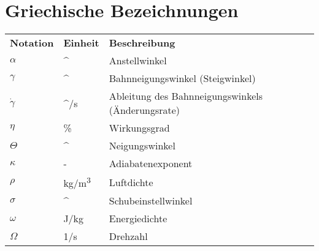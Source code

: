 \section*{Griechische Bezeichnungen}
\begin{longtable}{lp{2.5cm}p{10.5cm}}
	\textbf{Notation} & \textbf{Einheit} & \textbf{Beschreibung}\\
	\ensuremath{\alpha}	& \si{^\circ}		& Anstellwinkel \\
	\ensuremath{\gamma}	& \si{^\circ}		& Bahnneigungswinkel (Steigwinkel)\\
	\ensuremath{\dot{\gamma}}& \si{^\circ /s}& Ableitung des Bahnneigungswinkels (Änderungsrate) \\
	\ensuremath{\eta}	& \si{\%}			& Wirkungsgrad \\
	\ensuremath{\Theta} & \si{^\circ}		& Neigungswinkel \\
	\ensuremath{\kappa}	& -					& Adiabatenexponent \\
	\ensuremath{\rho}	& \si{kg/m^3}		& Luftdichte \\
	\ensuremath{\sigma}	& \si{^\circ}		& Schubeinstellwinkel\\
	\ensuremath{\omega}	& \si{J/kg}			& Energiedichte \\
	\ensuremath{\Omega}	& \si{1/s}			& Drehzahl
	
		
	
	
\end{longtable}
%
